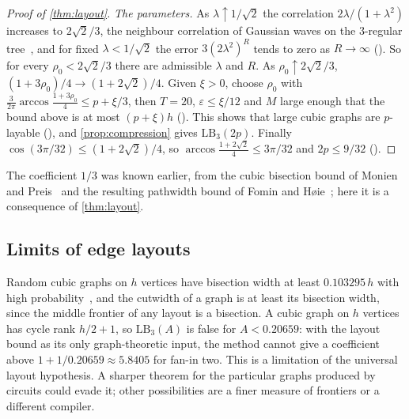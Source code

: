 \documentclass[11pt]{article}
\newcommand{\leanrefs}[1]{{\unskip\nobreak\hfil\penalty50\hskip1em\null\nobreak\hfil
  {\normalfont\small #1}\parfillskip=0pt\finalhyphendemerits=0\par}}
\newcommand{\leanref}[1]{\leanrefs{\lean{#1}}}
\theoremstyle{plain}
\theoremstyle{definition}
\theoremstyle{remark}
\newcommand{\LB}{\mathrm{LB}}
\begin{document}
\begin{proof}[Proof of \cref{thm:layout}]
\emph{The parameters.} As $\lambda \uparrow 1/\sqrt2$ the correlation $2\lambda/(1 + \lambda^2)$
increases to $2\sqrt2/3$, the neighbour correlation of Gaussian waves on the $3$-regular
tree~\cite{CGHV2015,Lyons2017}, and for fixed $\lambda < 1/\sqrt2$ the error $3(2\lambda^2)^R$
tends to zero as $R \to \infty$ (). So for every
$\rho_0 < 2\sqrt2/3$ there are admissible $\lambda$ and $R$. As $\rho_0 \uparrow 2\sqrt2/3$,
$(1 + 3\rho_0)/4 \to (1 + 2\sqrt2)/4$. Given $\xi > 0$, choose $\rho_0$ with
$\frac{3}{2\pi}\arccos\frac{1+3\rho_0}{4} \le p + \xi/3$, then $T = 20$, $\varepsilon \le \xi/12$
and $M$ large enough that the bound above is at most $(p + \xi)h$
(). This shows that large cubic graphs are $p$-layable
(), and \cref{prop:compression} gives
$\LB_3(2p)$. Finally $\cos(3\pi/32) \le (1 + 2\sqrt2)/4$, so
$\arccos\frac{1+2\sqrt2}{4} \le 3\pi/32$ and $2p \le 9/32$
().
\end{proof}


The coefficient $1/3$ was known earlier, from the cubic bisection bound of Monien and
Preis~\cite{MonienPreis2006} and the resulting pathwidth bound of Fomin and
H{\o}ie~\cite{FominHoie2006}; here it is a consequence of \cref{thm:layout}.

\subsection{Limits of edge layouts}
\label{sec:limits}

Random cubic graphs on $h$ vertices have bisection width at least $0.103295\,h$ with high
probability~\cite{LichevMitsche2020}, and the cutwidth of a graph is at least its bisection
width, since the middle frontier of any layout is a bisection. A cubic graph on $h$ vertices
has cycle rank $h/2 + 1$, so $\LB_3(A)$ is false for $A < 0.20659$: with the layout bound as its
only graph-theoretic input, the method cannot give a coefficient above
$1 + 1/0.20659 \approx 5.8405$ for fan-in two. This is a limitation of the universal layout
hypothesis. A sharper theorem for the particular graphs produced by circuits could evade it;
other possibilities are a finer measure of frontiers or a different compiler.
\end{document}

